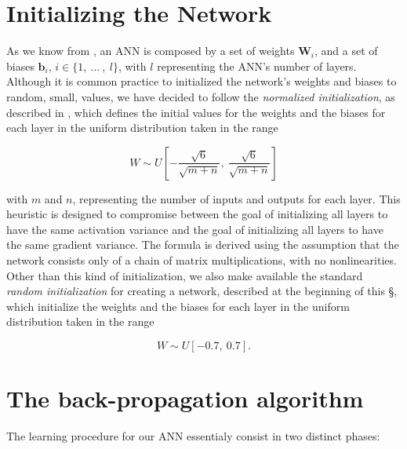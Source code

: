 	\section{Initializing the Network} %
	\label{sec:initializing_the_network}
		As we know from \cite{Goodfellow-et-al-2016,haykin2009neural,mitchell1997machine}, an ANN is composed by
		a set of weights $\mathbf{W}_{i}$, and a set of biases $\mathbf{b}_{i}$,
		$i \in \{ 1, \ \ldots \ , \ l \}$, with $l$ representing the ANN's number of layers. Although it is common
		practice to initialized the network's weights and biases to random, small, values, we have decided to
		follow the \textit{normalized initialization}, as described in
		\cite{Glorot10understandingthe,Goodfellow-et-al-2016}, which defines the initial values for the weights
		and the biases for each layer in the uniform distribution taken in the range

		\begin{equation*}
		    W \sim U \left [ -\frac{\sqrt{6}}{\sqrt{m + n}}, \ \frac{\sqrt{6}}{\sqrt{m + n}} \right ]
		\end{equation*}

		with $m$ and $n$, representing the number of inputs and outputs for each layer. This heuristic is
		designed to compromise between the goal of initializing all layers to have the same activation variance
		and the goal of initializing all layers to have the same gradient variance. The formula is derived using
		the assumption that the network consists only of a chain of matrix multiplications, with no
		nonlinearities. Other than this kind of initialization, we also make available the standard
		\textit{random initialization} for creating a network, described at the beginning of this \S, which
		initialize the weights and the biases for each layer in the uniform distribution taken in the range

		\begin{equation*}
		    W \sim U \left [ - 0.7, \ 0.7 \right ].
		\end{equation*}

	\section{The back-propagation algorithm} %
	\label{sec:the_back-propagation_algorithm}
		The learning procedure for our ANN essentialy consist in two distinct phases:

